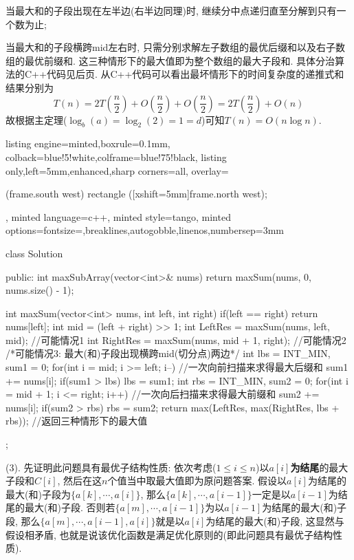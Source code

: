 \documentclass{article}
\begin{document}
\begin{homeworkProblem}
	当最大和的子段出现在左半边(右半边同理)时, 继续分中点递归直至分解到只有一个数为止;

	当最大和的子段横跨mid左右时, 只需分别求解左子数组的最优后缀和以及右子数组的最优前缀和. 这三种情形下的最大值即为整个数组的最大子段和. 具体分治算法的C++代码见后页. 从C++代码可以看出最坏情形下的时间复杂度的递推式和结果分别为$$T\left( n \right) =2T\left( \frac{n}{2} \right) +O\left( \frac{n}{2} \right) +O\left( \frac{n}{2} \right) =2T\left( \frac{n}{2} \right) +O\left( n \right)
	$$
	故根据主定理($\log_b(a)=\log_2(2)=1=d$)可知$T(n)=O(n\log n)$.
\begin{tcblisting}{listing engine=minted,boxrule=0.1mm,
colback=blue!5!white,colframe=blue!75!black,
listing only,left=5mm,enhanced,sharp corners=all,
overlay={\begin{tcbclipinterior} (frame.south west)
rectangle ([xshift=5mm]frame.north west);\end{tcbclipinterior}},
minted language=c++,
minted style=tango,
minted options={fontsize=\small,breaklines,autogobble,linenos,numbersep=3mm}}
class Solution {
public:
    int maxSubArray(vector<int>& nums) {
        return maxSum(nums, 0, nums.size() - 1);
    }

    int maxSum(vector<int> nums, int left, int right) {
        if(left == right) {
            return nums[left];
        }
        int mid = (left + right) >> 1;
        int LeftRes = maxSum(nums, left, mid);  //可能情况1
        int RightRes = maxSum(nums, mid + 1, right);  //可能情况2
        /*可能情况3: 最大(和)子段出现横跨mid(切分点)两边*/
        int lbs = INT_MIN, sum1 = 0;
        for(int i = mid; i >= left; i--) { //一次向前扫描来求得最大后缀和
            sum1 += nums[i];
            if(sum1 > lbs) {
                lbs = sum1;
            }
        }
        int rbs = INT_MIN, sum2 = 0;
        for(int i = mid + 1; i <= right; i++) { //一次向后扫描来求得最大前缀和
            sum2 += nums[i];
            if(sum2 > rbs) {
                rbs = sum2;
            }
        }
        return max(LeftRes, max(RightRes, lbs + rbs)); //返回三种情形下的最大值
    }
};
\end{tcblisting}
	(3). 先证明此问题具有最优子结构性质: 依次考虑($1\leq i\leq n$)以$a[i]$\textbf{为结尾}的最大子段和$C[i]$, 然后在这$n$个值当中取最大值即为原问题答案. 假设以$a[i]$为结尾的最大(和)子段为$\{a[k],\cdots,a[i]\}$, 那么$\{a[k],\cdots,a[i-1]\}$一定是以$a[i-1]$为结尾的最大(和)子段. 否则若$\{a[m],\cdots,a[i-1]\}$为以$a[i-1]$为结尾的最大(和)子段, 那么$\{a[m],\cdots,a[i-1],a[i]\}$就是以$a[i]$为结尾的最大(和)子段, 这显然与假设相矛盾, 也就是说该优化函数是满足优化原则的(即此问题具有最优子结构性质). 


\end{homeworkProblem}
\end{document}
